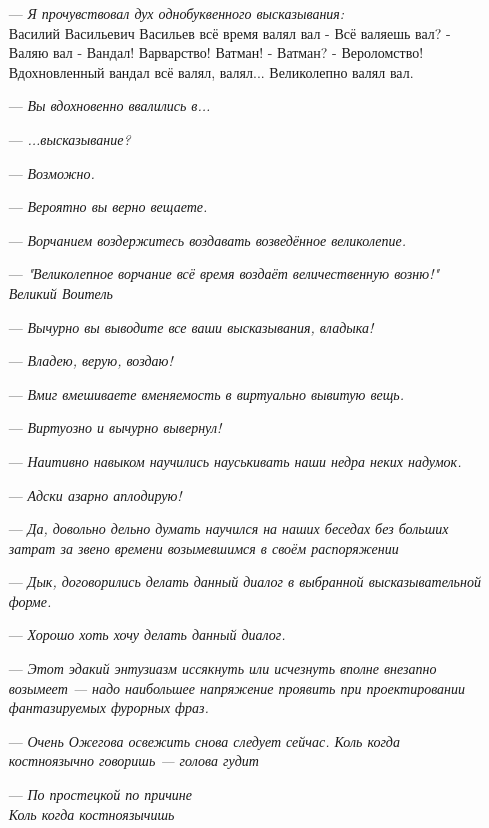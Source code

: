 \begin{itemize}
    \item[---] \emph{Я прочувствовал дух однобуквенного высказывания:}\\
    Василий Васильевич Васильев всё время валял вал
  - Всё валяешь вал?
  - Валяю вал
  - Вандал! Варварство! Ватман!
  - Ватман?
  - Вероломство!
  Вдохновленный вандал всё валял, валял... Великолепно валял вал.
  \item[---] \emph{Вы вдохновенно ввалились в...}
  \item[---] \emph{...высказывание?}
  \item[---] \emph{Возможно.}
  \item[---] \emph{Вероятно вы верно вещаете.}
  \item[---] \emph{Ворчанием воздержитесь воздавать возведённое великолепие.}
  \item[---] \emph{"Великолепное ворчание всё время воздаёт величественную возню!"\\
Великий Воитель}
  \item[---] \emph{Вычурно вы выводите все ваши высказывания, владыка!}
  \item[---] \emph{Владею, верую, воздаю!}
   \item[---] \emph{Вмиг вмешиваете вменяемость в виртуально вывитую вещь.}
  \item[---] \emph{Виртуозно и вычурно вывернул!}
  \item[---] \emph{Наитивно навыком научились науськивать наши недра неких надумок.}
  \item[---] \emph{Адски азарно аплодирую!}
  \item[---] \emph{Да, довольно дельно думать научился на наших беседах без больших затрат за звено времени возымевшимся в своём распоряжении}
  \item[---] \emph{Дык, договорились делать данный диалог в выбранной высказывательной форме.}
  \item[---] \emph{Хорошо хоть хочу делать данный диалог.}
  \item[---] \emph{Этот эдакий энтузиазм иссякнуть или исчезнуть вполне внезапно возымеет ---
  надо наибольшее напряжение проявить при проектировании фантазируемых фурорных фраз.}
  \item[---] \emph{Очень Ожегова освежить снова следует сейчас. 
Коль когда костноязычно говоришь --- голова гудит}
  \item[---] \emph{По простецкой по причине\\
                  Коль когда костноязычишь\\
}
\end{itemize}
